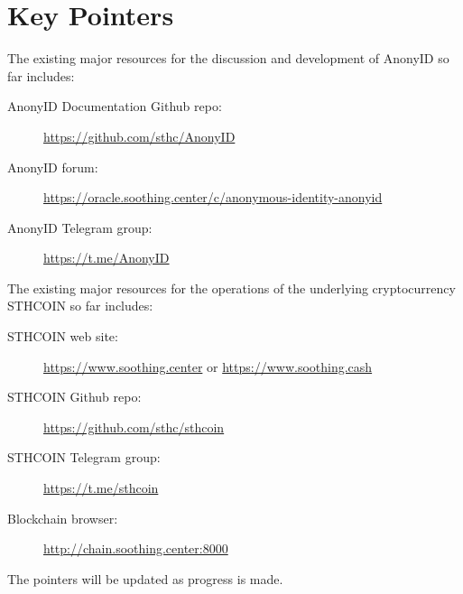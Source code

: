 \documentclass[12pt, a4paper]{article}
\begin{document}
\section{Key Pointers}

The existing major resources for the discussion and development of AnonyID so far includes:

\begin{description}
\item[AnonyID Documentation Github repo:] \href{https://github.com/sthc/AnonyID}{https://github.com/sthc/AnonyID}
\item[AnonyID forum:] \href{https://oracle.soothing.center/c/anonymous-identity-anonyid}{https://oracle.soothing.center/c/anonymous-identity-anonyid}
\item[AnonyID Telegram group:] \href{https://t.me/AnonyID}{https://t.me/AnonyID}
\end{description}

The existing major resources for the operations of the underlying cryptocurrency STHCOIN so far includes:

\begin{description}
\item[STHCOIN web site:] \href{https://www.soothing.center}{https://www.soothing.center} or  \href{https://www.soothing.cash}{https://www.soothing.cash}
\item[STHCOIN Github repo:] \href{https://github.com/sthc/sthcoin}{https://github.com/sthc/sthcoin}
\item[STHCOIN Telegram group:] \href{https://t.me/sthcoin}{https://t.me/sthcoin}
\item[Blockchain browser:] \href{http://chain.soothing.center:8000}{http://chain.soothing.center:8000}
\end{description}

The pointers will be updated as progress is made.
\end{document}
